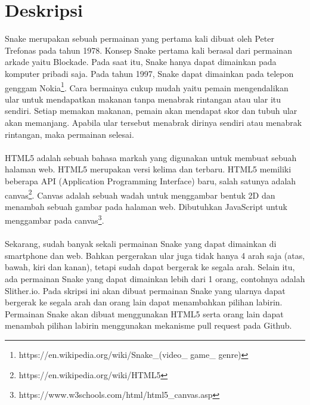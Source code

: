 \documentclass[a4paper,twoside]{article}
\begin{document}
\title{\@judultopik}
\author{\nama \textendash \@npm} 

\newcommand{\nama}{Evelyn Wijaya}
\newcommand{\@npm}{2015730030}
\newcommand{\@judultopik}{Open Source Snake 360} %
\newcommand{\jumpemb}{1} %
\newcommand{\tanggal}{07/09/2018}


\maketitle


\section{Deskripsi}
Snake merupakan sebuah permainan yang pertama kali dibuat oleh Peter Trefonas pada tahun 1978. Konsep Snake pertama kali berasal dari permainan arkade yaitu Blockade. Pada saat itu, Snake hanya dapat dimainkan pada komputer pribadi saja. Pada tahun 1997, Snake dapat dimainkan pada telepon genggam Nokia\footnote{https://en.wikipedia.org/wiki/Snake\_(video\_ game\_ genre)}. Cara bermainya cukup mudah yaitu pemain mengendalikan ular untuk mendapatkan makanan tanpa menabrak rintangan atau ular itu sendiri. Setiap memakan makanan, pemain akan mendapat skor dan tubuh ular akan memanjang. Apabila ular tersebut menabrak dirinya sendiri atau menabrak rintangan, maka permainan selesai.\\\\
HTML5 adalah sebuah bahasa markah yang digunakan untuk membuat sebuah halaman web. HTML5 merupakan versi kelima dan terbaru. HTML5 memiliki beberapa API (Application Programming Interface) baru, salah satunya adalah canvas\footnote{https://en.wikipedia.org/wiki/HTML5}. Canvas adalah sebuah wadah untuk menggambar bentuk 2D dan menambah sebuah gambar pada halaman web. Dibutuhkan JavaScript untuk menggambar pada canvas\footnote{https://www.w3schools.com/html/html5\_canvas.asp}.\\\\
Sekarang, sudah banyak sekali permainan Snake yang dapat dimainkan di smartphone dan web. Bahkan pergerakan ular juga tidak hanya 4 arah saja (atas, bawah, kiri dan kanan), tetapi sudah dapat bergerak ke segala arah. Selain itu, ada permainan Snake yang dapat dimainkan lebih dari 1 orang, contohnya adalah Slither.io. Pada skripsi ini akan dibuat permainan Snake yang ularnya dapat bergerak ke segala arah dan orang lain dapat menambahkan pilihan labirin. Permainan Snake akan dibuat menggunakan HTML5 serta orang lain dapat menambah pilihan labirin menggunakan mekanisme pull request pada Github.
\end{document}
